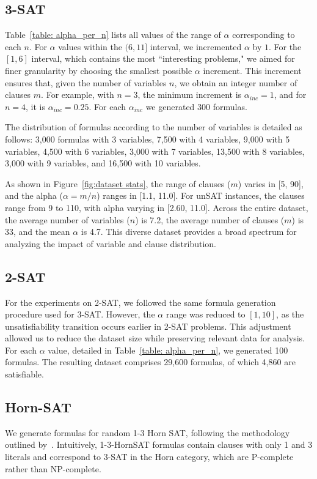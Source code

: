 \documentclass{article} %
\begin{document}
\subsection{3-SAT}
Table~\ref{table: alpha_per_n} lists all values of the range of $\alpha$ corresponding to each $n$. For $\alpha$ values within the $(6,11]$ interval, we incremented $\alpha$ by $1$. For the $[1,6]$ interval, which contains the most ``interesting problems," we aimed for finer granularity by choosing the smallest possible $\alpha$ increment. This increment ensures that, given the number of variables $n$, we obtain an integer number of clauses $m$. For example, with $n=3$, the minimum increment is $\alpha_{inc}=1$, and for $n=4$, it is $\alpha_{inc}=0.25$. For each $\alpha_{inc}$ we generated $300$ formulas.

The distribution of formulas according to the number of variables is detailed as follows: 3,000 formulas with 3 variables, 7,500 with 4 variables, 9,000 with 5 variables, 4,500 with 6 variables, 3,000 with 7 variables, 13,500 with 8 variables, 3,000 with 9 variables, and 16,500 with 10 variables.

As shown in Figure~\ref{fig:dataset stats}, the range of clauses ($m$) varies in [5, 90], and the alpha ($\alpha = m/n$) ranges in [1.1, 11.0]. For unSAT instances, the clauses range from 9 to 110, with alpha varying in [2.60, 11.0]. Across the entire dataset, the average number of variables ($n$) is 7.2, the average number of clauses ($m$) is 33, and the mean $\alpha$ is 4.7. This diverse dataset provides a broad spectrum for analyzing the impact of variable and clause distribution.

\subsection{2-SAT}
For the experiments on 2-SAT, we followed the same formula generation procedure used for 3-SAT. However, the $\alpha$ range was reduced to $[1, 10]$, as the unsatisfiability transition occurs earlier in 2-SAT problems. This adjustment allowed us to reduce the dataset size while preserving relevant data for analysis. For each $\alpha$ value, detailed in Table~\ref{table: alpha_per_n}, we generated 100 formulas. The resulting dataset comprises 29,600 formulas, of which 4,860 are satisfiable.

\subsection{Horn-SAT}
We generate formulas for random 1-3 Horn SAT, following the methodology outlined by~\citet{moore2007continuous}. Intuitively, 1-3-HornSAT formulas contain clauses with only 1 and 3 literals and correspond to 3-SAT in the Horn category, which are P-complete rather than NP-complete.
\end{document}
